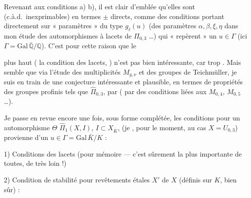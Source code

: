 \documentclass[11pt,a4paper]{article}
\begin{document}
 Revenant aux conditions a) b), il est clair d'emblée qu'elles sont  (c.à.d.\ inexprimables) en termes $\pm$ directs, comme des conditions portant directement sur  « paramètres » \struck{\ill{}}  du type $g_{\ell}(u)$ (des paramètres \ill{}  \ill{} $\alpha, \beta, \xi, \eta$ dans mon étude des automorphismes à lacets de $\Pi_{0,3}$ \ldots) qui « repèrent » un $u \in \Gamma$ (ici $\Gamma = \mathrm{Gal}\,\bar{\mathbb{Q}}/\mathbb{Q}$).  C'est pour cette raison que le

\ill{} plus haut ( \ill{}  \ill{} la condition des lacets, ) n'est pas bien intéressante, car \ill{} trop . Mais  semble que via l'étude des multiplicités  $M_{g,\nu}$ et des groupes de Teichmüller, je suis en train de  \ill{} \ill{} une conjecture \ill{} \ill{} \ill{} intéressante et plausible, en termes de propriétés \ill{} des groupes profinis tels que $\hat{\Pi}_{0,3}$, \ill{} par  \ill{} ( par des conditions liées aux $M_{0,4}$, $M_{0,5}$ \ldots).

Je passe en revue encore une fois, sous forme complétée, les conditions pour un automorphisme $\Theta$  $\hat{\Pi}_1(X, I)$, $I \subset X_{\bar K}$,  (je , pour le moment, au cas $X = U_{0,3}$) provienne d'un $u \in \Gamma = \mathrm{Gal}\,\bar{K}/K$ :

1) Conditions des lacets (pour mémoire --- c'est sûrement la plus importante de toutes, de très loin !)

2) Condition de stabilité pour revêtements étales $X'$ de $X$ (définis sur $K$, bien sûr) :

\end{document}
